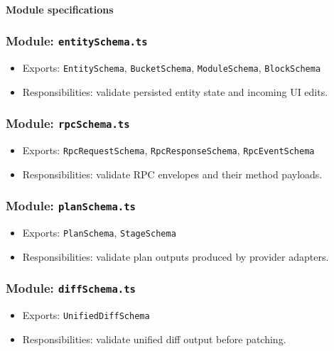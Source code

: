 \documentclass[11pt]{article}
\begin{document}
\paragraph{Module specifications}
\subsubsection*{Module: \texttt{entitySchema.ts}}
\begin{itemize}[noitemsep]
  \item Exports: \texttt{EntitySchema}, \texttt{BucketSchema}, \texttt{ModuleSchema}, \texttt{BlockSchema}
  \item Responsibilities: validate persisted entity state and incoming UI edits.
\end{itemize}

\subsubsection*{Module: \texttt{rpcSchema.ts}}
\begin{itemize}[noitemsep]
  \item Exports: \texttt{RpcRequestSchema}, \texttt{RpcResponseSchema}, \texttt{RpcEventSchema}
  \item Responsibilities: validate RPC envelopes and their method payloads.
\end{itemize}

\subsubsection*{Module: \texttt{planSchema.ts}}
\begin{itemize}[noitemsep]
  \item Exports: \texttt{PlanSchema}, \texttt{StageSchema}
  \item Responsibilities: validate plan outputs produced by provider adapters.
\end{itemize}

\subsubsection*{Module: \texttt{diffSchema.ts}}
\begin{itemize}[noitemsep]
  \item Exports: \texttt{UnifiedDiffSchema}
  \item Responsibilities: validate unified diff output before patching.
\end{itemize}
\end{document}
